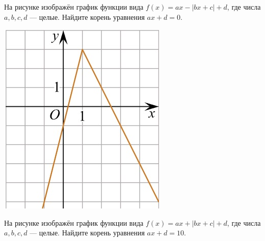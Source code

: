 \begin{class}[number=5]
\begin{listofex}
\begin{minipage}[c]{0.35\textwidth}
		\end{minipage}
		\item
		\begin{minipage}[t]{0.76\textwidth}
			На рисунке изображён график функции вида \(f(x)=ax-|bx+c|+d\), где числа \(a, b, c, d\) --- целые. Найдите корень уравнения \(ax+d=0\).
		\end{minipage}
		\begin{minipage}[c]{0.17\textwidth}
			\includegraphics[align=t, width=\textwidth]{pics/G111M4C5-3.jpg}
		\end{minipage}
		\item
		\begin{minipage}[t]{0.76\textwidth}
			На рисунке изображён график функции вида \(f(x)=ax+|bx+c|+d\), где числа \(a, b, c, d\) --- целые. Найдите корень уравнения \(ax+d=10\).
		\end{minipage}
		\begin{minipage}[c]{0.15\textwidth}

\end{minipage}
\end{listofex}
\end{class}
